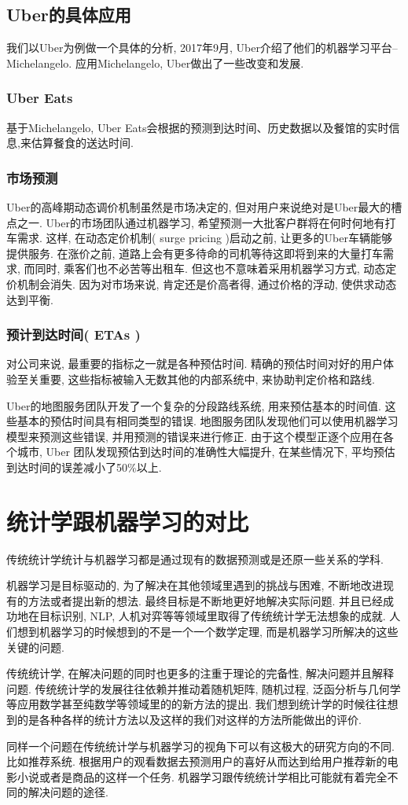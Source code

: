 \documentclass[lang=cn,11pt,a4paper]{elegantpaper}
\begin{document}
\subsection{Uber的具体应用}
我们以Uber为例做一个具体的分析, 2017年9月, Uber介绍了他们的机器学习平台--Michelangelo. 应用Michelangelo, Uber做出了一些改变和发展. 
\subsubsection*{Uber Eats} 
基于Michelangelo, Uber Eats会根据的预测到达时间、历史数据以及餐馆的实时信息,来估算餐食的送达时间. 
\subsubsection*{市场预测}
Uber的高峰期动态调价机制虽然是市场决定的, 但对用户来说绝对是Uber最大的槽点之一. Uber的市场团队通过机器学习, 希望预测一大批客户群将在何时何地有打车需求. 这样, 在动态定价机制( surge  pricing )启动之前, 让更多的Uber车辆能够提供服务. 在涨价之前, 道路上会有更多待命的司机等待这即将到来的大量打车需求, 而同时, 乘客们也不必苦等出租车. 但这也不意味着采用机器学习方式, 动态定价机制会消失. 因为对市场来说, 肯定还是价高者得, 通过价格的浮动, 使供求动态达到平衡. 
\subsubsection*{预计到达时间( ETAs )}
对公司来说, 最重要的指标之一就是各种预估时间. 精确的预估时间对好的用户体验至关重要, 这些指标被输入无数其他的内部系统中, 来协助判定价格和路线. 

Uber的地图服务团队开发了一个复杂的分段路线系统, 用来预估基本的时间值. 这些基本的预估时间具有相同类型的错误. 地图服务团队发现他们可以使用机器学习模型来预测这些错误, 并用预测的错误来进行修正. 由于这个模型正逐个应用在各个城市, Uber 团队发现预估到达时间的准确性大幅提升, 在某些情况下, 平均预估到达时间的误差减小了50\%以上. 

\section{统计学跟机器学习的对比}
\par 传统统计学统计与机器学习都是通过现有的数据预测或是还原一些关系的学科. 
\par 机器学习是目标驱动的, 为了解决在其他领域里遇到的挑战与困难, 不断地改进现有的方法或者提出新的想法. 最终目标是不断地更好地解决实际问题. 并且已经成功地在目标识别, NLP, 人机对弈等等领域里取得了传统统计学无法想象的成就. 人们想到机器学习的时候想到的不是一个一个数学定理, 而是机器学习所解决的这些关键的问题. 
\par 传统统计学, 在解决问题的同时也更多的注重于理论的完备性, 解决问题并且解释问题. 传统统计学的发展往往依赖并推动着随机矩阵, 随机过程, 泛函分析与几何学等应用数学甚至纯数学等领域里的的新方法的提出. 我们想到统计学的时候往往想到的是各种各样的统计方法以及这样的我们对这样的方法所能做出的评价.
\par 同样一个问题在传统统计学与机器学习的视角下可以有这极大的研究方向的不同. 比如推荐系统. 根据用户的观看数据去预测用户的喜好从而达到给用户推荐新的电影小说或者是商品的这样一个任务. 机器学习跟传统统计学相比可能就有着完全不同的解决问题的途径.
\end{document}
